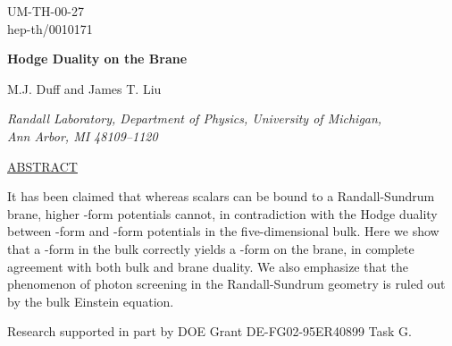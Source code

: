\documentclass[a4paper,12pt]{article}
\def\hoch#1{\myHighlight{$\, ^{#1}$}\coordHE{}}
\begin{document}

\begin{flushright}
UM-TH-00-27\\
hep-th/0010171\\
\end{flushright}

\vspace{40pt}

\begin{center}

{\bf Hodge Duality on the Brane}

\vspace{20pt}

M.J. Duff\hoch{1} and
James T. Liu\hoch{1}


\vspace{10pt}
{\it
Randall Laboratory, Department of Physics, University of Michigan,\\
Ann Arbor, MI 48109--1120}


\vspace{30pt}


\underline{ABSTRACT}
\end{center}
\noindent
It has been claimed that whereas scalars can be bound to a
Randall-Sundrum brane, higher \coordHE{}-form potentials cannot, in
contradiction with the Hodge duality between \coordHE{}-form and
\coordHE{}-form potentials in the five-dimensional bulk. Here we show
that a \coordHE{}-form in the bulk correctly yields a \coordHE{}-form on the
brane, in complete agreement with both bulk and brane duality.
We also emphasize that the phenomenon of photon screening in the
Randall-Sundrum geometry is ruled out by the bulk Einstein equation.

{\vfill\leftline{}\vfill
\vskip 10pt \footnoterule
{\footnotesize\noindent\hoch{1}
Research supported in part by DOE Grant DE-FG02-95ER40899 Task G.
\vskip  -12pt} \vskip   14pt
}

\newpage

\end{document}
